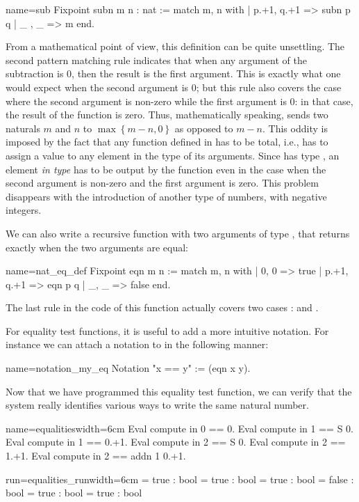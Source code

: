 \begin{coq}{name=sub}{}
Fixpoint subn m n : nat :=
  match m, n with
  | p.+1, q.+1 => subn p q
  | _ , _ => m
  end.
\end{coq}
From a mathematical point of view, this definition can be quite
unsettling.  The second pattern matching rule indicates that when
any argument of the subtraction is 0, then the result is
the first argument.  This is exactly what one would expect when the
second argument is 0; but this rule also covers the case where the
second argument is non-zero while the first argument is 0: in that
case, the result of the function is zero. Thus, mathematically speaking,
 sends two naturals \(m\) and \(n\) to
\(\max\left\{m-n, 0\right\}\) as opposed to \(m-n\).
This oddity is imposed by
the fact that any function defined in \Coq{} has to be total, i.e., has
to assign a value to any element in the type of its arguments. Since
 has type ,
an element \emph{in type}  has to be
output by the function even in the case when  the second argument is
non-zero and the first argument is zero. This problem disappears with
the introduction of another type of numbers, with negative integers.


We can also write a recursive function with two arguments of
type , that returns  exactly when the two arguments are
equal:

\begin{coq}{name=nat_eq_def}{}
Fixpoint eqn m n :=
  match m, n with
  | 0, 0 => true
  | p.+1, q.+1 => eqn p q
  | _, _ => false
  end.
\end{coq}

The last rule in the code of this function actually covers two cases :
 and .

For equality test functions, it is useful to add a more intuitive
notation.  For instance we can attach a notation to  in
the following manner:

\begin{coq}{name=notation_my_eq}{}
Notation "x == y" := (eqn x y).
\end{coq}

Now
that we have programmed this equality test function, we can verify
that the \Coq{} system really identifies various ways to write the same
natural number.

\begin{coq}{name=equalities}{width=6cm}
Eval compute in 0 == 0.
Eval compute in 1 == S 0.
Eval compute in 1 == 0.+1.
Eval compute in 2 == S 0.
Eval compute in 2 == 1.+1.
Eval compute in 2 == addn 1 0.+1.
\end{coq}
\begin{coqout}{run=equalities_run}{width=6cm}
= true : bool
= true : bool
= true : bool
= false : bool
= true : bool
= true : bool
\end{coqout}


